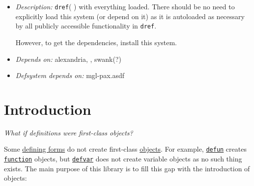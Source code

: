 \begin{itemize}
  \begin{itemize}
  \item
    \emph{Description:}
    \texttt{dref}(
    ) with everything
    loaded. There should be no need to explicitly load this system (or
    depend on it) as it is autoloaded as necessary by all publicly
    accessible functionality in \texttt{dref}.

    However, to get the dependencies, install this system.
  \item
    \emph{Depends on:} alexandria,
    ,
    swank(?)
  \item
    \emph{Defsystem depends on:} mgl-pax.asdf
  \end{itemize}
\end{itemize}

\section{Introduction}\label{introduction}

\label{x-28DREF-3A-40INTRODUCTION-20MGL-PAX-3ASECTION-29}

\emph{What if definitions were first-class objects?}

Some
\href{http://www.lispworks.com/documentation/HyperSpec/Body/26_glo_d.htm\#defining_form}{defining
forms} do not create first-class
\href{http://www.lispworks.com/documentation/HyperSpec/Body/26_glo_o.htm\#object}{objects}.
For example,
\href{http://www.lispworks.com/documentation/HyperSpec/Body/m_defun.htm}{\texttt{defun}}
creates
\href{http://www.lispworks.com/documentation/HyperSpec/Body/t_fn.htm}{\texttt{function}}
objects, but
\href{http://www.lispworks.com/documentation/HyperSpec/Body/m_defpar.htm}{\texttt{defvar}}
does not create variable objects as no such thing exists. The main
purpose of this library is to fill this gap with the introduction of
 objects:

\begin{Shaded}
\begin{Highlighting}[]
\NormalTok{(}
  \NormalTok{)}
 \NormalTok{)}
\end{Highlighting}
\end{Shaded}

